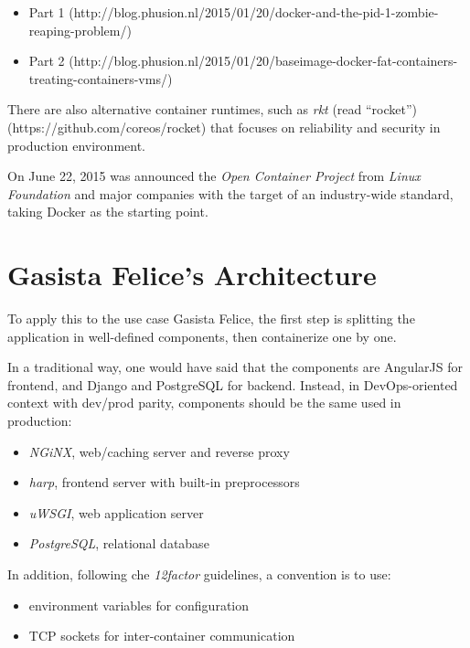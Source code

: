 \begin{itemize}
\itemsep1pt\parskip0pt
\item
  Part 1
  (http://blog.phusion.nl/2015/01/20/docker-and-the-pid-1-zombie-reaping-problem/)
\item
  Part 2
  (http://blog.phusion.nl/2015/01/20/baseimage-docker-fat-containers-treating-containers-vms/)
\end{itemize}

There are also alternative container runtimes, such as \emph{rkt} (read
``rocket'') (https://github.com/coreos/rocket) that focuses on
reliability and security in production environment.

On June 22, 2015 was announced the \emph{Open Container
Project}\cite{OpenContainerProject} from \emph{Linux Foundation} and
major companies with the target of an industry-wide standard, taking
Docker as the starting point.

\section{Gasista Felice's
Architecture}\label{gasista-felices-architecture}

To apply this to the use case Gasista Felice, the first step is
splitting the application in well-defined components, then containerize
one by one.

In a traditional way, one would have said that the components are
AngularJS for frontend, and Django and PostgreSQL for backend. Instead,
in DevOps-oriented context with dev/prod parity, components should be
the same used in production:

\begin{itemize}
\itemsep1pt\parskip0pt
\item
  \emph{NGiNX}, web/caching server and reverse proxy
\item
  \emph{harp}, frontend server with built-in preprocessors
\item
  \emph{uWSGI}, web application server
\item
  \emph{PostgreSQL}, relational database
\end{itemize}

In addition, following che \emph{12factor} guidelines, a convention is
to use:

\begin{itemize}
\itemsep1pt\parskip0pt
\item
  environment variables for configuration
\item
  TCP sockets for inter-container communication
\end{itemize}

